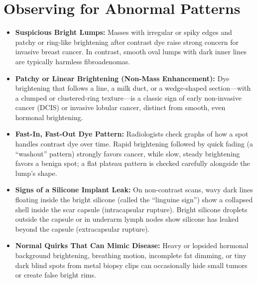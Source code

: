 \section{Observing for Abnormal Patterns}
\begin{itemize}
\item \textbf{Suspicious Bright Lumps:} Masses with irregular or spiky edges and patchy or ring-like brightening after contrast dye raise strong concern for invasive breast cancer. In contrast, smooth oval lumps with dark inner lines are typically harmless fibroadenomas.
\item \textbf{Patchy or Linear Brightening (Non-Mass Enhancement):} Dye brightening that follows a line, a milk duct, or a wedge-shaped section---with a clumped or clustered-ring texture---is a classic sign of early non-invasive cancer (DCIS) or invasive lobular cancer, distinct from smooth, even hormonal brightening.
\item \textbf{Fast-In, Fast-Out Dye Pattern:} Radiologists check graphs of how a spot handles contrast dye over time. Rapid brightening followed by quick fading (a ``washout'' pattern) strongly favors cancer, while slow, steady brightening favors a benign spot; a flat plateau pattern is checked carefully alongside the lump's shape.
\item \textbf{Signs of a Silicone Implant Leak:} On non-contrast scans, wavy dark lines floating inside the bright silicone (called the ``linguine sign'') show a collapsed shell inside the scar capsule (intracapsular rupture). Bright silicone droplets outside the capsule or in underarm lymph nodes show silicone has leaked beyond the capsule (extracapsular rupture).
\item \textbf{Normal Quirks That Can Mimic Disease:} Heavy or lopsided hormonal background brightening, breathing motion, incomplete fat dimming, or tiny dark blind spots from metal biopsy clips can occasionally hide small tumors or create false bright rims.
\end{itemize}

